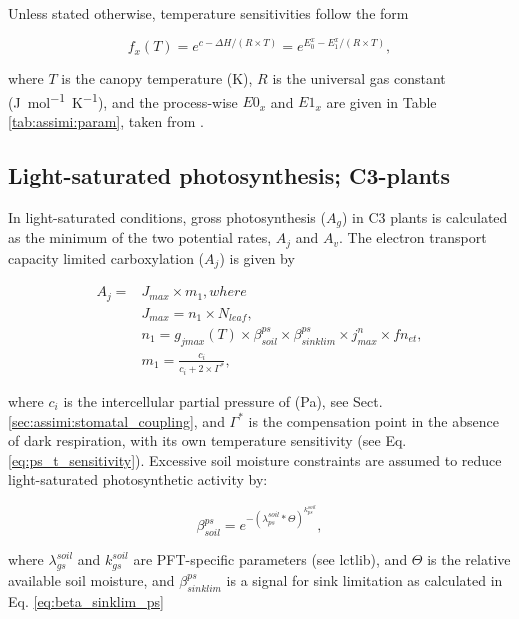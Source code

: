 Unless stated otherwise, temperature sensitivities follow the form

\begin{equation}\label{eq:ps_t_sensitivity}
f_x(T) = e^{c-\Delta H/(R\times T)} = e^{E_0^x - E_1^x/(R\times T)},
\end{equation}

where $T$ is the canopy temperature (\unit{K}), $R$ is the universal gas constant (\unit{J mol^{-1} K^{-1}}), and the process-wise $E0_x$ and $E1_x$ are given in Table \ref{tab:assimi:param}, taken from \cite{Bernacchi:2001wv}.

\subsection{Light-saturated photosynthesis; C3-plants}

In light-saturated conditions, gross photosynthesis ($A_g$) in C3 plants is calculated as the minimum of the two potential rates, $A_j$ and $A_v$. The electron transport capacity limited carboxylation ($A_j$) is given by 

\begin{subequations}\label{eq:jmax}
\begin{align}
A_j=& J_{max} \times m_1, where \\
&J_{max} = n_1 \times N_{leaf},  \\
&n_1 = g_{jmax}(T) \times \beta_{soil}^{ps} \times \beta_{sinklim}^{ps} \times j_{max}^n \times fn_{et}, \\ 
&m_1=\frac{c_i}{c_i+2\times \Gamma^{*}},  
\end{align} 
\end{subequations} 

where $c_i$ is the intercellular partial pressure of  (\unit{Pa}), see Sect. \ref{sec:assimi:stomatal_coupling}, and $\Gamma^{*}$ is the  compensation point in the absence of dark respiration, with its own temperature sensitivity (see Eq. \ref{eq:ps_t_sensitivity}). Excessive soil moisture constraints are assumed to reduce light-saturated photosynthetic activity by: 

\begin{equation}
\beta_{soil}^{ps} = e^{-(\lambda^{soil}_{ps}*\Theta)^{k^{soil}_{ps}}},
\end{equation}

where $\lambda^{soil}_{gs}$ and $k^{soil}_{gs}$ are PFT-specific parameters (see lctlib), and $\Theta$ is the relative available soil moisture, and $\beta_{sinklim}^{ps}$ is a signal for sink limitation as calculated in Eq. \ref{eq:beta_sinklim_ps}

